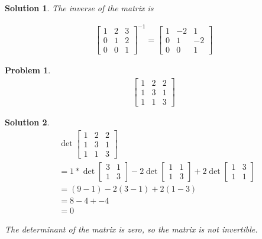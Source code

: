 \documentclass{article}
\newtheorem{problem}{Problem}
\newtheorem*{solution}{Solution}
\begin{document}
\begin{solution}
The inverse of the matrix is 

\begin{align*}
\begin{bmatrix}
1 & 2 & 3 \\ 0 & 1 & 2 \\ 0 & 0 & 1
\end{bmatrix}^{-1} = \begin{bmatrix}
1 & -2 & 1 \\ 0 & 1 & -2 \\ 0 & 0 & 1
\end{bmatrix}
\end{align*}

\end{solution}

\begin{problem}
\begin{align*}
\begin{bmatrix}
1 & 2 & 2 \\ 1 & 3 & 1 \\ 1 & 1 & 3
\end{bmatrix}
\end{align*}
\end{problem}

\begin{solution}
\begin{align*}
& \det \begin{bmatrix}
1 & 2 & 2 \\ 1 & 3 & 1 \\ 1 & 1 & 3
\end{bmatrix} \\
&= 1 * \det \begin{bmatrix}3 & 1 \\ 1 & 3\end{bmatrix} - 2 \det \begin{bmatrix}1 & 1 \\ 1 & 3\end{bmatrix} + 2 \det \begin{bmatrix}1 & 3 \\ 1 & 1\end{bmatrix} \\
&= (9-1) - 2(3-1) + 2(1-3) \\
&= 8 - 4 + -4 \\
&= 0
\end{align*}

The determinant of the matrix is zero, so the matrix is not invertible.

\end{solution}
\end{document}
